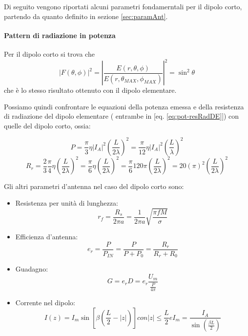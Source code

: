 Di seguito vengono riportati alcuni parametri fondamerntali per il dipolo corto, partendo da quanto definito in sezione \ref{sec:paramAnt}.

\paragraph{Pattern di radiazione in potenza}
Per il dipolo corto si trova che
\begin{equation}
\left | F(\theta, \phi) \right |^2 = \left | \frac{E(r, \theta, \phi)}{E(r, \theta_{MAX}, \phi_{MAX})} \right |^2 = \sin^2\theta
\end{equation}
che è lo stesso risultato ottenuto con il dipolo elementare.

Possiamo quindi confrontare le equazioni della potenza emessa e della resistenza di radiazione del dipolo elementare ( entrambe in [eq. \eqref{eq:pot-resRadDE}]) con quelle del dipolo corto, ossia:

\begin{equation}
P = \frac{\pi}{3} \eta \left | I_A \right |^2 \left(\frac{L}{2 \lambda}\right)^2 = \frac{\pi}{12} \eta \left | I_A \right |^2 \left(\frac{L}{\lambda}\right)^2
\end{equation}
\begin{equation}
R_r = \frac{2}{3} \frac{\pi}{4} \eta \left(\frac{L}{2 \lambda}\right)^2 = \frac{\pi}{6} \eta \left(\frac{L}{2 \lambda}\right)^2 = \frac{\pi}{6} 120 \pi  \left(\frac{L}{2 \lambda}\right)^2 = 20 (\pi)^2 \left(\frac{L}{2 \lambda}\right)^2
\end{equation}

Gli altri parametri d'antenna nel caso del dipolo corto sono:
\begin{itemize}
  \item Resistenza per unità di lunghezza:
    \begin{equation}
      r_f = \frac{R_s}{2 \pi a} = \frac{1}{2 \pi a} \sqrt{\frac{\pi f M }{\sigma}}
    \end{equation}
  \item Efficienza d'antenna:
    \begin{equation}
      e_r = \frac{P}{P_{IN}} = \frac{P}{P + P_0} = \frac{R_r}{R_r + R_0}
    \end{equation}
  \item Guadagno:
    \begin{equation}
      G = e_r D = e_r \frac{U_m}{\frac{P}{4 \pi}}
    \end{equation}
  \item Corrente nel dipolo:
    \begin{equation}
      I(z) = I_m \sin [\beta (\frac{L}{2} - \left | z \right |)] con \left | z \right | \le \frac{L}{2} e I_m = \frac{I_A}{\sin (\frac{\beta L}{2})}
    \end{equation}

\end{itemize}

